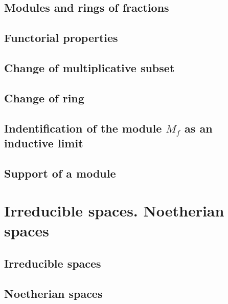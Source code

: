 \documentclass[10pt,oneside]{amsart}
\begin{document}
        \subsection{Modules and rings of fractions}
        

        \subsection{Functorial properties}
        

        \subsection{Change of multiplicative subset}
        

        \subsection{Change of ring}
        

        \subsection{Indentification of the module $M_f$ as an inductive limit}
        

        \subsection{Support of a module}
        

    \section{Irreducible spaces. Noetherian spaces}

        \subsection{Irreducible spaces}
        

        \subsection{Noetherian spaces}
        
\end{document}
